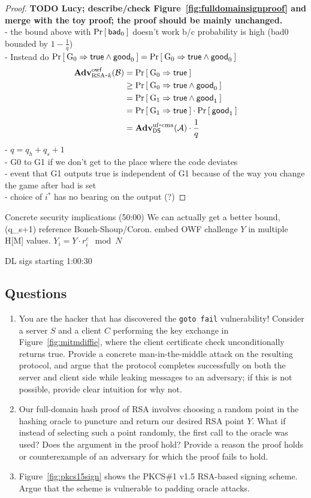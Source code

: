 \begin{proof}
\textbf{TODO Lucy; describe/check Figure~\ref{fig:fulldomainsignproof} and merge with the toy proof; the proof should be mainly unchanged.}\\
- the bound above with $\Pr\left[\: \mathsf{bad}_0 \:\right]$ doesn't work b/c probability is high (bad0 bounded by $1-\frac{1}{q}$)\\
- Instead do $\Pr\left[\: {{\textnormal G}}_0\Rightarrow\mathsf{true} \land \mathsf{good}_0 \:\right]=\Pr\left[\: {{\textnormal G}}_0\Rightarrow\mathsf{true} \land \mathsf{good}_0 \:\right]$\\
\begin{align*}
\mathbf{Adv}^{\mathrm{owf}}_{{\textnormal{RSA}\mbox{-} k}}({\mathcal B}) &= \Pr\left[\: {{\textnormal G}}_0\Rightarrow\mathsf{true} \:\right]\\
&\geq \Pr\left[\: {{\textnormal G}}_0\Rightarrow\mathsf{true} \land \mathsf{good}_0 \:\right]\\
&= \Pr\left[\: {{\textnormal G}}_1\Rightarrow\mathsf{true} \land \mathsf{good}_1 \:\right]\\
&= \Pr\left[\: {{\textnormal G}}_1\Rightarrow\mathsf{true} \:\right]\cdot \Pr\left[\: \mathsf{good}_1 \:\right]\\
&= \mathbf{Adv}^{\mathrm{uf\mbox{-} cma}}_{{\mathsf{DS}}}({\mathcal A})\cdot\frac{1}{q}
\end{align*}
- $q=q_h+q_s+1$\\
- G0 to G1 if we don't get to the place where the code deviates\\
- event that G1 outputs true is independent of G1 because of the way you change the game after bad is set\\
- choice of $i^*$ has no bearing on the output (?)
\end{proof}

Concrete security implications (50:00)
We can actually get a better bound, 
\bnm
\AdvUFCMA{\DS}{\advA}\cdot(q_s+1)\cdot {}
\enm
reference Boneh-Shoup/Coron. embed OWF challenge $Y$ in multiple H[M] values. $Y_i=Y\cdot r_i^e\mod N$

DL sigs starting 1:00:30
\subsection{Questions}

\begin{enumerate}
\item You are the hacker that has discovered the \texttt{goto fail} vulnerability!  Consider a server $S$ and a client $C$ performing the key exchange in Figure~\ref{fig:mitmdiffie}, where the client certificate check unconditionally returns true.  Provide a concrete man-in-the-middle attack on the resulting protocol, and argue that the protocol completes successfully on both the server and client side while leaking messages to an adversary; if this is not possible, provide clear intuition for why not.
\item Our full-domain hash proof of RSA involves choosing a random point in the hashing oracle to puncture and return our desired RSA point $Y$.  What if instead of selecting such a point randomly, the first call to the oracle was used?  Does the argument in the proof hold?  Provide a reason the proof holds or counterexample of an adversary for which the proof fails to hold.
\item Figure~\ref{fig:pkcs15sign} shows the PKCS\#1 v1.5 RSA-based signing scheme.  Argue that the scheme is vulnerable to padding oracle attacks.
\end{enumerate}